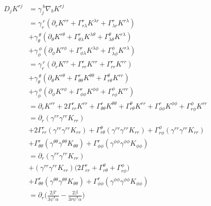 \documentclass[12pt]{article}
\numberwithin{equation}{section}
\begin{document}
\begin{equation}
\begin{aligned}
D_j K^{rj} &= \gamma_{j}^{~b} \nabla_b K^{rj} \\
&= \gamma_r^{~r} (\partial_r K^{r r} + \Gamma^{r}_{r \lambda} K^{\lambda r} + \Gamma^{r}_{\lambda r} K^{r \lambda}) \\
&+ \gamma_\theta^{~\theta} (\partial_\theta K^{r \theta} + \Gamma^{r}_{\theta \lambda} K^{\lambda \theta} + \Gamma^{\theta}_{\lambda \theta} K^{r \lambda}) \\
&+ \gamma_\phi^{~\phi} (\partial_\phi K^{r \phi} + \Gamma^{r}_{\phi \lambda} K^{\lambda \phi} + \Gamma^{\phi}_{\lambda \phi} K^{r \lambda}) \\
&= \gamma_r^{~r} (\partial_r K^{r r} + \Gamma^{r}_{r r} K^{r r} + \Gamma^{r}_{r r} K^{r r}) \\
&+ \gamma_\theta^{~\theta} (\partial_\theta K^{r \theta} + \Gamma^{r}_{\theta \theta} K^{\theta \theta} + \Gamma^{\theta}_{r \theta} K^{r r}) \\
&+ \gamma_\phi^{~\phi} (\partial_\phi K^{r \phi} + \Gamma^{r}_{\phi \phi} K^{\phi \phi} + \Gamma^{\phi}_{r \phi} K^{r r}) \\
&= \partial_r K^{r r} + 2 \Gamma^{r}_{r r} K^{r r} + \Gamma^{r}_{\theta \theta} K^{\theta \theta} + \Gamma^{\theta}_{r \theta} K^{r r} + \Gamma^{r}_{\phi \phi} K^{\phi \phi} + \Gamma^{\phi}_{r \phi} K^{r r} \\
&= \partial_r (\gamma^{rr} \gamma^{rr} K_{r r}) \\
&+ 2 \Gamma^{r}_{r r} (\gamma^{rr} \gamma^{rr} K_{r r}) + \Gamma^{\theta}_{r \theta} (\gamma^{rr} \gamma^{rr} K_{r r}) + \Gamma^{\phi}_{r \phi} (\gamma^{rr} \gamma^{rr} K_{r r}) \\
&+ \Gamma^{r}_{\theta \theta} (\gamma^{\theta \theta} \gamma^{\theta \theta} K_{\theta \theta}) + \Gamma^{r}_{\phi \phi} (\gamma^{\phi \phi} \gamma^{\phi \phi} K_{\phi \phi}) \\
&= \partial_r (\gamma^{rr} \gamma^{rr} K_{r r}) \\
&+ (\gamma^{rr} \gamma^{rr} K_{r r}) \Big( 2 \Gamma^{r}_{r r} + \Gamma^{\theta}_{r \theta} + \Gamma^{\phi}_{r \phi} \Big) \\
&+ \Gamma^{r}_{\theta \theta} (\gamma^{\theta \theta} \gamma^{\theta \theta} K_{\theta \theta}) + \Gamma^{r}_{\phi \phi} (\gamma^{\phi \phi} \gamma^{\phi \phi} K_{\phi \phi}) \\
&= \partial_r  \Big( \frac{2 \beta'}{3 \psi^{4} \alpha} - \frac{2 \beta}{3 r \psi^{4} \alpha} \Big)  \\

\end{aligned}
\end{equation}
\end{document}
